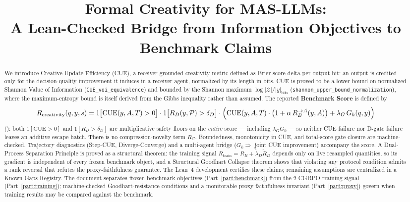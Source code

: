 \documentclass[11pt]{article}
\title{Formal Creativity for MAS-LLMs:\\A Lean-Checked Bridge from Information Objectives to Benchmark Claims}
\author{}
\date{}
\theoremstyle{remark}
\newcommand{\LeanName}[1]{\texttt{\detokenize{#1}}}
\begin{document}
\maketitle

\begin{abstract}
We introduce Creative Update Efficiency (CUE), a receiver-grounded creativity
metric defined as Brier-score delta per output bit: an output is credited only
for the decision-quality improvement it induces in a receiver agent,
normalized by its length in bits. CUE is proved to be a lower bound on
normalized Shannon Value of Information
(\texttt{CUE\_voi\_equivalence}) and bounded by the Shannon maximum
$\log|\mathcal{Z}|/|y|_{\mathrm{bits}}$
(\texttt{shannon\_upper\_bound\_normalization}), where the maximum-entropy
bound is itself derived from the Gibbs inequality rather than assumed.
The reported \textbf{Benchmark Score} is defined by
\[
  R_{\mathrm{creativity}}(q,y,s)
  =
  1\bigl[\mathrm{CUE}(y,A,T)>0\bigr]
  \cdot 1\bigl[R_D(y,\mathcal{P})>\delta_D\bigr]
  \cdot\Bigl(
    \mathrm{CUE}(y,A,T)\cdot\bigl(1+\alpha\,R_B^{\to A}(y,A)\bigr)
    +\lambda_G\,G_k(q,y)
  \Bigr)
\]
(\LeanName{Rcreativity}): both $1[\mathrm{CUE}>0]$ and
$1[R_D>\delta_D]$ are multiplicative safety floors on the
\emph{entire} score --- including $\lambda_G G_k$ --- so neither CUE failure
nor D-gate failure leaves an additive escape hatch. There is no
compression-novelty term $R_C$. Boundedness, monotonicity in CUE, and
total-score gate closure are machine-checked. Trajectory diagnostics (Step-CUE, Diverge-Converge)
and a multi-agent bridge ($G_k\Rightarrow$ joint CUE improvement) accompany
the score. A Dual-Process Separation Principle is proved as a structural
theorem: the training signal $R_{\mathrm{train}}=R_B+\tilde\lambda_D\tilde R_D$
depends only on live resampled quantities, so its gradient is independent of
every frozen benchmark object, and a Structural Goodhart Collapse theorem shows
that violating any protocol condition admits a rank reversal that refutes the
proxy-faithfulness guarantee. The Lean~4 development certifies these claims;
remaining assumptions are centralized in a Known Gaps Registry. The document
separates frozen benchmark objectives (Part~\ref{part:benchmark}) from the
2-CGRPO training signal (Part~\ref{part:training}); machine-checked
Goodhart-resistance conditions and a monitorable proxy faithfulness invariant
(Part~\ref{part:proxy}) govern when training results may be compared against
the benchmark.
\end{abstract}
\end{document}
